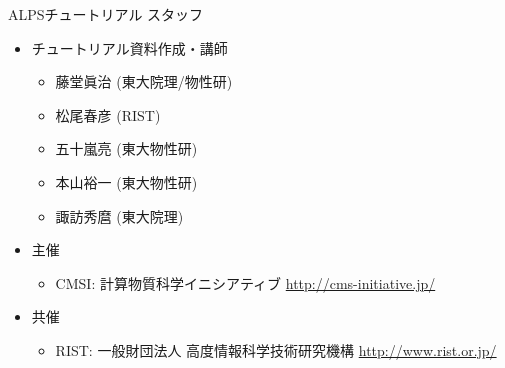 \begin{frame}[t,fragile]{ALPSチュートリアル スタッフ}
  \begin{itemize}
  \item チュートリアル資料作成・講師
    \begin{itemize}
    \item 藤堂眞治 (東大院理/物性研)
    \item 松尾春彦 (RIST)
    \item 五十嵐亮 (東大物性研)
    \item 本山裕一 (東大物性研)
    \item 諏訪秀麿 (東大院理)
    \end{itemize}
  \item 主催
    \begin{itemize}
    \item CMSI: 計算物質科学イニシアティブ \url{http://cms-initiative.jp/}
    \end{itemize}
  \item 共催
    \begin{itemize}
    \item RIST: 一般財団法人 高度情報科学技術研究機構 \url{http://www.rist.or.jp/}
    \end{itemize}
  \end{itemize}
\end{frame}

